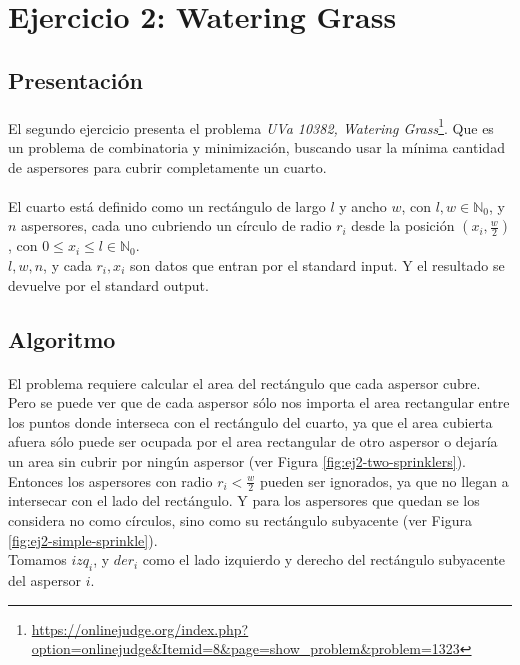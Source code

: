 \documentclass[./main.tex]{subfiles}
\begin{document}
\section{Ejercicio 2: Watering Grass}
\label{sec:ej2}

\subsection{Presentación}
\label{sec:ej2-intro}

\paragraph{} El segundo ejercicio presenta el problema \textit{UVa 10382, Watering Grass}\footnote{\url{https://onlinejudge.org/index.php?option=onlinejudge&Itemid=8&page=show_problem&problem=1323}}. Que es un problema de combinatoria y minimización, buscando usar la mínima cantidad de aspersores para cubrir completamente un cuarto.

\paragraph{} El cuarto está definido como un rectángulo de largo \(l\) y ancho \(w\), con \(l, w \in \mathbb{N}_0\), y \(n\) aspersores, cada uno cubriendo un círculo de radio \(r_i\) desde la posición \((x_i, \frac{w}{2})\), con \(0 \leq x_i \leq l \in \mathbb{N}_0\). \\
\(l, w, n\), y cada \(r_i, x_i\) son datos que entran por el standard input. Y el resultado se devuelve por el standard output.

\subsection{Algoritmo}
\label{sec:ej2-algo}

\paragraph{} El problema requiere calcular el area del rectángulo que cada aspersor cubre. Pero se puede ver que de cada aspersor sólo nos importa el area rectangular entre los puntos donde interseca con el rectángulo del cuarto, ya que el area cubierta afuera sólo puede ser ocupada por el area rectangular de otro aspersor o dejaría un area sin cubrir por ningún aspersor (ver Figura \ref{fig:ej2-two-sprinklers}). \\
\indent Entonces los aspersores con radio \(r_i < \frac{w}{2}\) pueden ser ignorados, ya que no llegan a intersecar con el lado del rectángulo. Y para los aspersores que quedan se los considera no como círculos, sino como su rectángulo subyacente (ver Figura \ref{fig:ej2-simple-sprinkle}). \\
Tomamos \(izq_i\), y \(der_i\) como el lado izquierdo y derecho del rectángulo subyacente del aspersor \(i\).
\end{document}
